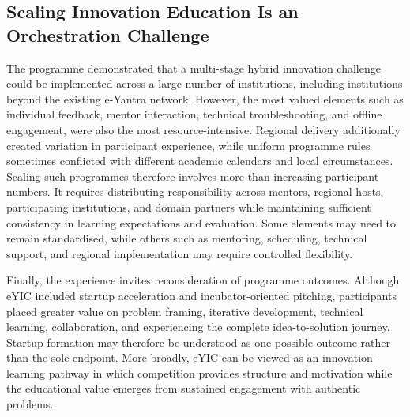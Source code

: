 \documentclass[runningheads]{llncs}
\begin{document}
\subsection{Scaling Innovation Education Is an Orchestration Challenge}

The programme demonstrated that a multi-stage hybrid innovation challenge could be implemented across a large number of institutions, including institutions beyond the existing e-Yantra network. However, the most valued elements such as individual feedback, mentor interaction, technical troubleshooting, and offline engagement, were also the most resource-intensive. Regional delivery additionally created variation in participant experience, while uniform programme rules sometimes conflicted with different academic calendars and local circumstances. Scaling such programmes therefore involves more than increasing participant numbers. It requires distributing responsibility across mentors, regional hosts, participating institutions, and domain partners while maintaining sufficient consistency in learning expectations and evaluation. Some elements may need to remain standardised, while others such as mentoring, scheduling, technical support, and regional implementation may require controlled flexibility.

Finally, the experience invites reconsideration of programme outcomes. Although eYIC included startup acceleration and incubator-oriented pitching, participants placed greater value on problem framing, iterative development, technical learning, collaboration, and experiencing the complete idea-to-solution journey. Startup formation may therefore be understood as one possible outcome rather than the sole endpoint. More broadly, eYIC can be viewed as an innovation-learning pathway in which competition provides structure and motivation while the educational value emerges from sustained engagement with authentic problems.
\end{document}
